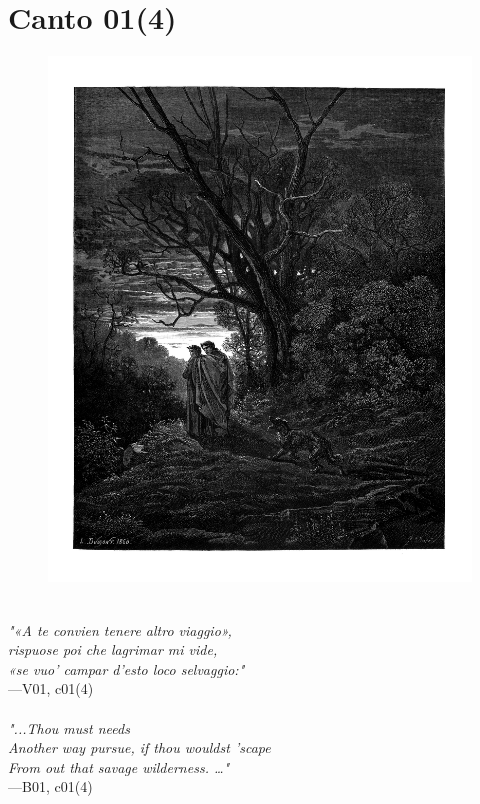 \documentclass[../Dore_vision.tex]{subfiles}
\begin{document}
\newpage

\section{Canto 01(4)}

\begin{figure}[ht]
\centering
\includegraphics[height=\figsize]{illustrations/book_1/V01, c01(4).jpg}
\end{figure}

\begin{center}
\begin{minipage}{0.8\linewidth}
\textit{\\
"«A te convien tenere altro viaggio»,\\rispuose poi che lagrimar mi vide,\\«se vuo’ campar d’esto loco selvaggio:"} \\
—V01, c01(4) \\~\\
\textit{"...\textquotesingle Thou must needs\\Another way pursue, if thou wouldst 'scape\\From out that savage wilderness. …"} \\
—B01, c01(4)
\end{minipage}
\end{center}
\end{document}
